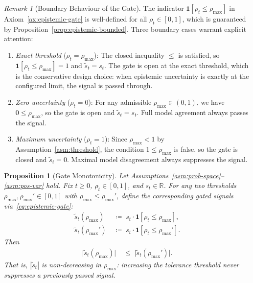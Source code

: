 \documentclass[12pt,openany]{book}
\numberwithin{equation}{chapter}
\theoremstyle{plain}
\newtheorem{proposition}[theorem]{Proposition}
\theoremstyle{definition}
\theoremstyle{remark}
\newtheorem{remark}[theorem]{Remark}
\numberwithin{equation}{chapter}
\theoremstyle{plain}
\begin{document}
\begin{remark}[Boundary Behaviour of the Gate]
\label{rem:gate-boundary}
The indicator $\mathbf{1}[\rho_t \leq \rho_{\max}]$ in
Axiom~\ref{ax:epistemic-gate} is well-defined for all
$\rho_t \in [0, 1]$, which is guaranteed by
Proposition~\ref{prop:epistemic-bounded}.  Three boundary cases
warrant explicit attention:
\begin{enumerate}
  \item \emph{Exact threshold} ($\rho_t = \rho_{\max}$):
        The closed inequality $\leq$ is satisfied, so
        $\mathbf{1}[\rho_t \leq \rho_{\max}] = 1$ and
        $\tilde{s}_t = s_t$.  The gate is open at the exact
        threshold, which is the conservative design choice: when
        epistemic uncertainty is exactly at the configured limit,
        the signal is passed through.
  \item \emph{Zero uncertainty} ($\rho_t = 0$):
        For any admissible $\rho_{\max} \in (0,1)$, we have
        $0 \leq \rho_{\max}$, so the gate is open and
        $\tilde{s}_t = s_t$.  Full model agreement always passes
        the signal.
  \item \emph{Maximum uncertainty} ($\rho_t = 1$):
        Since $\rho_{\max} < 1$ by Assumption~\ref{asm:threshold},
        the condition $1 \leq \rho_{\max}$ is false, so the gate
        is closed and $\tilde{s}_t = 0$.  Maximal model
        disagreement always suppresses the signal.
\end{enumerate}
\end{remark}

\begin{proposition}[Gate Monotonicity]
\label{prop:gate-monotone}
Let Assumptions~\ref{asm:prob-space}--\ref{asm:pos-var} hold.
Fix $t \geq 0$, $\rho_t \in [0,1]$, and $s_t \in \mathbb{R}$.
For any two thresholds $\rho_{\max}, \rho_{\max}' \in [0,1]$
with $\rho_{\max} \leq \rho_{\max}'$, define the corresponding
gated signals via~\eqref{eq:epistemic-gate}:
\begin{align}
  \tilde{s}_t(\rho_{\max})
  &\;\coloneqq\;
  s_t \cdot \mathbf{1}[\rho_t \leq \rho_{\max}],
  \label{eq:mono-gate1}\\[4pt]
  \tilde{s}_t(\rho_{\max}')
  &\;\coloneqq\;
  s_t \cdot \mathbf{1}[\rho_t \leq \rho_{\max}'].
  \label{eq:mono-gate2}
\end{align}
Then
\begin{align}
  \bigl|\tilde{s}_t(\rho_{\max})\bigr|
  &\;\leq\;
  \bigl|\tilde{s}_t(\rho_{\max}')\bigr|.
  \label{eq:mono-conclusion}
\end{align}
That is, $|\tilde{s}_t|$ is non-decreasing in $\rho_{\max}$:
increasing the tolerance threshold never suppresses a previously
passed signal.
\end{proposition}
\end{document}
